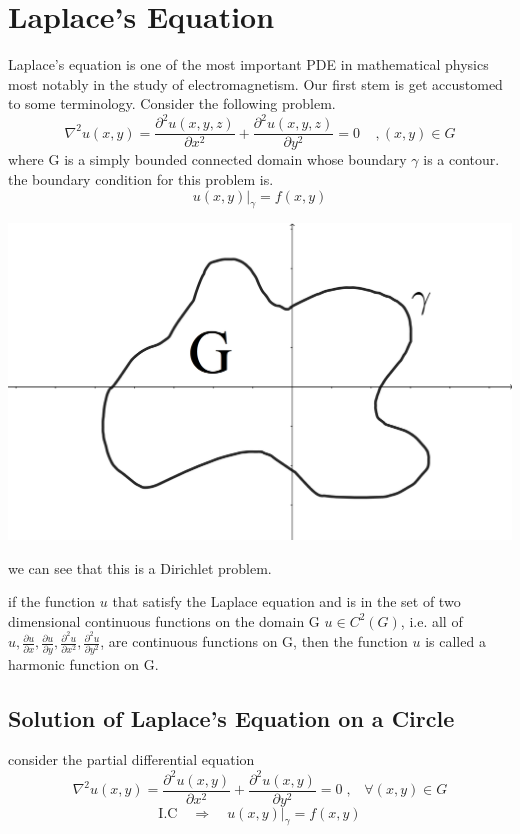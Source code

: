 \documentclass[]{article}
\begin{document}
\section{Laplace's Equation}
Laplace's equation is one of the most important PDE in mathematical physics most notably in the study of electromagnetism. Our first stem is get accustomed to some terminology. Consider the following problem.
\[
    \nabla^2 u(x,y)= \frac{\partial^2 u(x,y,z)}{\partial x^2}+\frac{\partial^2 u(x,y,z)}{\partial y^2} = 0 \;\;\;\; , (x,y) \in G    
\]
where G is a simply bounded connected domain whose boundary $\gamma$ is a contour.
\\
the boundary condition for this problem is.
\[
    u(x,y)|_\gamma = f(x,y)    
\]
\begin{center}
\includegraphics[scale=0.1]{domain.png}
\end{center}
we can see that this is a Dirichlet problem.
\par
if the function $u$ that satisfy the Laplace equation and is in the set of two dimensional continuous functions on the domain G $u \in C^2(G)$, 
i.e. all of $u, \frac{\partial u}{\partial x}, \frac{\partial u}{\partial y}, \frac{\partial^2 u}{\partial x^2},\frac{\partial^2 u}{\partial y^2}$,
are continuous functions on G, then the function $u$ is called a harmonic function on G.

\setcounter{equation}{0}
\subsection{Solution of Laplace's Equation on a Circle}

consider the partial differential equation
\begin{equation}
\nabla^2 u(x,y) = \frac{\partial^2 u(x,y)}{\partial x^2} + \frac{\partial^2 u(x,y)}{\partial y^2} = 0\;, \;\;\; \forall (x,y) \in G
\end{equation}
\begin{equation}
\text{I.C} \quad \Longrightarrow \quad u(x,y)|_\gamma = f(x,y)
\end{equation}
\end{document}
